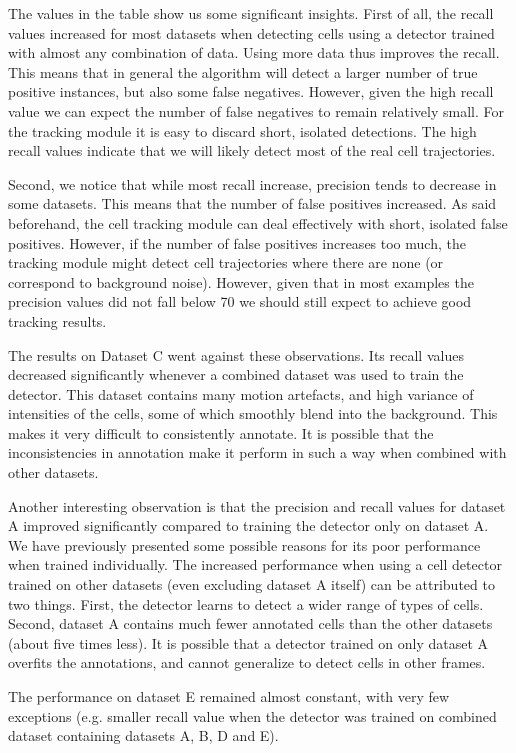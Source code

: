		The values in the table show us some significant insights. First of all, the recall values increased for most datasets when detecting cells using a detector trained with almost any combination of data. Using more data thus improves the recall. This means that in general the algorithm will detect a larger number of true positive instances, but also some false negatives. However, given the high recall value we can expect the number of false negatives to remain relatively small. For the tracking module it is easy to discard short, isolated detections. The high recall values indicate that we will likely detect most of the real cell trajectories.
		
		Second, we notice that while most recall increase, precision tends to decrease in some datasets. This means that the number of false positives increased. As said beforehand, the cell tracking module can deal effectively with short, isolated false positives. However, if the number of false positives increases too much, the tracking module might detect cell trajectories where there are none (or correspond to background noise). However, given that in most examples the precision values did not fall below 70 we should still expect to achieve good tracking results.
		
		The results on Dataset C went against these observations. Its recall values decreased significantly whenever a combined dataset was used to train the detector. This dataset contains many motion artefacts, and high variance of intensities of the cells, some of which smoothly blend into the background. This makes it very difficult to consistently annotate. It is possible that the inconsistencies in annotation make it perform in such a way when combined with other datasets.
		
		Another interesting observation is that the precision and recall values for dataset A improved significantly compared to training the detector only on dataset A. We have previously presented some possible reasons for its poor performance when trained individually. The increased performance when using a cell detector trained on other datasets (even excluding dataset A itself) can be attributed to two things. First, the detector learns to detect a wider range of types of cells. Second, dataset A contains much fewer annotated cells than the other datasets (about five times less). It is possible that a detector trained on only dataset A overfits the annotations, and cannot generalize to detect cells in other frames. 
		
		The performance on dataset E remained almost constant, with very few exceptions (e.g. smaller recall value when the detector was trained on combined dataset containing datasets A, B, D and E).

